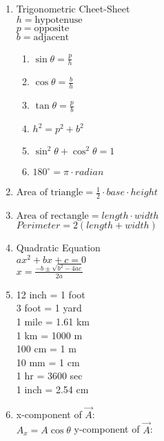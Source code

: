 \documentclass[12pt, letterpaper]{article}
\begin{document}
\begin{enumerate}
  \item Trigonometric Cheet-Sheet\\
        $h = \text{hypotenuse}$\\
        $p = \text{opposite}$\\
        $b = \text{adjacent}$
        \begin{enumerate}
          \item $\sin \theta = \frac{p}{h}$
          \item $\cos \theta = \frac{b}{h}$
          \item $\tan \theta = \frac{p}{b}$
          \item $h^2 = p^2 + b^2$
          \item $\sin^2 \theta + \cos^2 \theta = 1$
          \item $180 ^{\circ} = \pi \cdot radian$
        \end{enumerate}
        \item $\text{Area of triangle} = \frac{1}{2} \cdot base \cdot height$
        \item $\text{Area of rectangle} = length \cdot width$\\
              $Perimeter = 2(length + width)$
        \item Quadratic Equation\\
              $ax^2 + bx + c = 0$\\
              $x = \frac{-b \pm \sqrt{b^2 - 4ac}}{2a}$
        \item 12 inch = 1 foot\\
              3 foot = 1 yard\\
              1 mile = 1.61 km\\
              1 km = 1000 m\\
              100 cm = 1 m\\
              10 mm = 1 cm\\
              1 hr = 3600 sec\\
              1 inch = 2.54 cm
        \item x-component of $\overrightarrow A$:\\
              $A_x = A \cos \theta$
              y-component of $\overrightarrow A$:\\

\end{enumerate}
\end{document}

